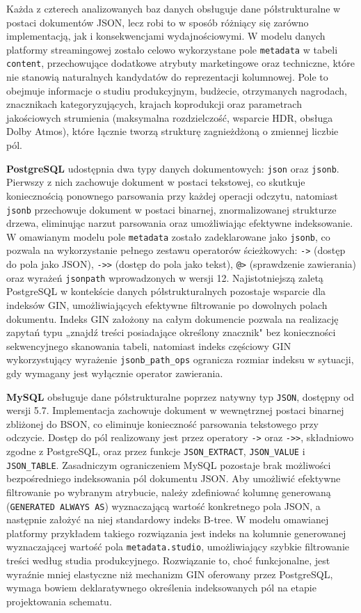 Każda z czterech analizowanych baz danych obsługuje dane półstrukturalne
w postaci dokumentów JSON, lecz robi to w sposób różniący się zarówno
implementacją, jak i konsekwencjami wydajnościowymi. W modelu danych platformy
streamingowej zostało celowo wykorzystane pole \texttt{metadata} w tabeli
\texttt{content}, przechowujące dodatkowe atrybuty marketingowe oraz
techniczne, które nie stanowią naturalnych kandydatów do reprezentacji
kolumnowej. Pole to obejmuje informacje o studiu produkcyjnym, budżecie,
otrzymanych nagrodach, znacznikach kategoryzujących, krajach koprodukcji
oraz parametrach jakościowych strumienia (maksymalna rozdzielczość, wsparcie
HDR, obsługa Dolby Atmos), które łącznie tworzą strukturę zagnieżdżoną
o zmiennej liczbie pól.

\textbf{PostgreSQL} udostępnia dwa typy danych dokumentowych: \texttt{json}
oraz \texttt{jsonb}. Pierwszy z nich zachowuje dokument w postaci tekstowej,
co skutkuje koniecznością ponownego parsowania przy każdej operacji odczytu,
natomiast \texttt{jsonb} przechowuje dokument w postaci binarnej, znormalizowanej
strukturze drzewa, eliminując narzut parsowania oraz umożliwiając efektywne
indeksowanie. W omawianym modelu pole \texttt{metadata} zostało zadeklarowane
jako \texttt{jsonb}, co pozwala na wykorzystanie pełnego zestawu operatorów
ścieżkowych: \texttt{->} (dostęp do pola jako JSON), \texttt{->>} (dostęp
do pola jako tekst), \texttt{@>} (sprawdzenie zawierania) oraz wyrażeń
\texttt{jsonpath} wprowadzonych w wersji 12. Najistotniejszą zaletą
PostgreSQL w kontekście danych półstrukturalnych pozostaje wsparcie dla
indeksów GIN, umożliwiających efektywne filtrowanie po dowolnych polach
dokumentu. Indeks GIN założony na całym dokumencie pozwala na realizację
zapytań typu „znajdź treści posiadające określony znacznik" bez konieczności
sekwencyjnego skanowania tabeli, natomiast indeks częściowy GIN wykorzystujący
wyrażenie \texttt{jsonb\_path\_ops} ogranicza rozmiar indeksu w sytuacji,
gdy wymagany jest wyłącznie operator zawierania.

\textbf{MySQL} obsługuje dane półstrukturalne poprzez natywny typ
\texttt{JSON}, dostępny od wersji 5.7. Implementacja zachowuje dokument
w wewnętrznej postaci binarnej zbliżonej do BSON, co eliminuje konieczność
parsowania tekstowego przy odczycie. Dostęp do pól realizowany jest przez
operatory \texttt{->} oraz \texttt{->>}, składniowo zgodne z PostgreSQL,
oraz przez funkcje \texttt{JSON\_EXTRACT}, \texttt{JSON\_VALUE} i
\texttt{JSON\_TABLE}. Zasadniczym ograniczeniem MySQL pozostaje brak
możliwości bezpośredniego indeksowania pól dokumentu JSON. Aby umożliwić
efektywne filtrowanie po wybranym atrybucie, należy zdefiniować kolumnę
generowaną (\texttt{GENERATED ALWAYS AS}) wyznaczającą wartość konkretnego
pola JSON, a następnie założyć na niej standardowy indeks B-tree. W modelu
omawianej platformy przykładem takiego rozwiązania jest indeks na kolumnie
generowanej wyznaczającej wartość pola \texttt{metadata.studio}, umożliwiający
szybkie filtrowanie treści według studia produkcyjnego. Rozwiązanie to,
choć funkcjonalne, jest wyraźnie mniej elastyczne niż mechanizm GIN
oferowany przez PostgreSQL, wymaga bowiem deklaratywnego określenia
indeksowanych pól na etapie projektowania schematu.

